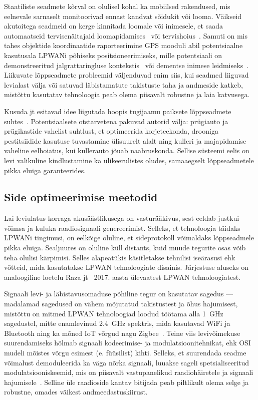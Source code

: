 \documentclass[12pt]{article}
\begin{document}
    Staatiliste seadmete kõrval on olulisel kohal ka mobiilsed rakendused, mis eelnevale sarnaselt monitoorivad ennast kandvat sõidukit või looma.
    Väikseid akutoitega seadmeid on kerge kinnitada loomale või inimesele, et saada automaatseid tervisenäitajaid loomapidamises~\cite{germani, liliu} või tervishoius~\cite{olatinwo, petajajarvi}.
    Samuti on mis tahes objektide koordinaatide raporteerimine GPS mooduli abil potentsiaalne kasutusala LPWANi põhiseks positsioneerimiseks, mille potentsiaali on demonstreeritud jalgrattaringluse kontekstis~\cite{kimpark} või dementse inimese leidmiseks~\cite{hadwen}.
    Liikuvate lõppseadmete probleemid väljenduvad enim siis, kui seadmed liiguvad levialast välja või satuvad läbistamatute takistuste taha ja andmeside katkeb, mistõttu kasutatav tehnoloogia peab olema piisavalt robustne ja laia katvusega.

    Kusuda jt esitavad idee liigutada hoopis tugijaamu paiksete lõppseadmete suhtes~\cite{kusuda}.
    Potentsiaalsete otstarvetena pakuvad autorid välja: prügiauto ja prügikastide vahelist suhtlust, et optimeerida korjeteekonda, drooniga pestitsiidide kasutuse tuvastamine ülisuurelt alalt ning kulleri ja majapidamise vaheline eelhoiatus, kui kullerauto jõuab naabruskonda.
    Sellise süsteemi eelis on levi valikuline kindlustamine ka ülikeerulistes oludes, samaaegselt lõppseadmetele pikka eluiga garanteerides.

    \subsection{Side optimeerimise meetodid}

    Lai leviulatus korraga akusäästlikusega on vasturääkivus, sest eeldab justkui võimsa ja kuluka raadiosignaali genereerimist.
    Selleks, et tehnoloogia täidaks LPWANi tingimusi, on eelkõige oluline, et sideprotokoll võimaldaks lõppseadmele pikka eluiga.
    Sealjuures on oluline küll distants, kuid muude tegurite osas võib teha olulisi kärpimisi.
    Selles alapeatükis käsitletakse tehnilisi iseärasusi ehk võtteid, mida kasutatakse LPWAN tehnoloogiate disainis.
    Järjestuse aluseks on analoogiline loetelu Raza jt~\cite{raza} 2017. aasta ülevaatest LPWAN tehnoloogiatest.

    Signaali levi- ja läbistavusomaduse põhiline tegur on kasutatav sagedus — madalamad sagedused on vähem mõjutatud takistustest ja õhus hajumisest, mistõttu on mitmed LPWAN tehnoloogiad loodud töötama alla \SI{1}{\giga\hertz} sagedustel, mitte enamlevinud \SI{2,4}{\giga\hertz} spektris, mida kasutavad WiFi ja Bluetooth ning ka mõned IoT võrgud nagu Zigbee~\cite{bardyn}.
    Teine viis levivõimekuse suurendamiseks hõlmab signaali kodeerimise- ja modulatsioonitehnikat, ehk OSI mudeli mõistes võrgu esimest (e. füüsilist) kihti. Selleks, et suurendada seadme võimalust demoduleerida ka väga nõrka signaali, luuakse sageli spetsialiseeritud modulatsiooniskeemid, mis on piisavalt vastupanelikud raadiohäiretele ja signaali hajumisele~\cite{reynders}.
    Selline üle raadioside kantav bitijada peab piltlikult olema selge ja robustne, omades väikest andmeedastuskiirust.
\end{document}
